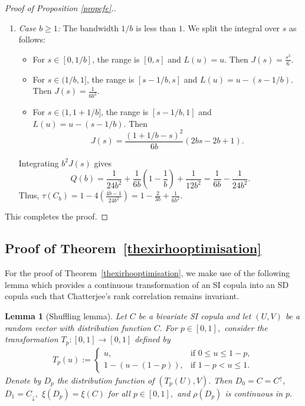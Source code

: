 \documentclass{article}
\theoremstyle{plain}
\newtheorem{lemma}{Lemma}
\theoremstyle{definition}
\begin{document}
\begin{proof}[Proof of Proposition \ref{propcfe}.]
\begin{enumerate}[label=(\roman*), font=\upshape]
    \item \emph{Case \(b \ge 1\):} The bandwidth \(1/b\) is less than \(1\). We split the integral over \(s\) as follows:
    \begin{itemize}
        \item For \(s \in [0, 1/b]\), the range is \([0,s]\) and \(L(u) = u\). Then \(J(s) = \frac{s^3}{6}\).
        \item For \(s \in (1/b, 1]\), the range is \([s-1/b, s]\) and \(L(u) = u - (s-1/b)\). Then \(J(s) = \frac{1}{6b^3}\).
        \item For \(s \in (1, 1+1/b]\), the range is \([s-1/b, 1]\) and \(L(u) = u - (s-1/b)\).
        Then
        \[
        J(s) = \frac{(1+1/b-s)^2}{6b}(2bs - 2b + 1)
        .\]
    \end{itemize}
    Integrating \(b^2 J(s)\) gives
    \[
        Q(b) = \frac{1}{24b^2} + \frac{1}{6b}\left(1-\frac{1}{b}\right) + \frac{1}{12b^2} = \frac{1}{6b} - \frac{1}{24b^2}.
    \]
    Thus, \(\tau(C_b) = 1 - 4\left(\frac{4b-1}{24b^2}\right) = 1 - \frac{2}{3b} + \frac{1}{6b^2}\).
\end{enumerate}
This completes the proof.
\end{proof}



\subsection{Proof of Theorem~\ref{thexirhooptimisation}}

For the proof of Theorem~\ref{thexirhooptimisation}, we make use of the following lemma which provides a continuous transformation of an SI copula into an SD copula such that Chatterjee's rank correlation remains invariant.

\begin{lemma}[Shuffling lemma]\label{lemshuff}
    Let \(C\) be a bivariate SI copula and let \((U,V)\) be a random vector with distribution function \(C.\) For \(p\in [0,1],\) consider the transformation \(T_p\colon [0,1]\to [0,1]\) defined by
    \begin{align}
        T_p(u) := \begin{cases}
        u, &\text{if } 0\le u \le 1-p,\\
        1-(u-(1-p)), & \text{if } 1-p < u \le 1.
    \end{cases}
    \end{align}
    Denote by \(D_p\) the distribution function of \((T_p(U),V).\) Then \(D_0 = C = C^\uparrow\), \(D_1 = C_\downarrow,\) \(\xi(D_p) = \xi(C)\) for all \(p\in [0,1],\) and \(\rho(D_p)\) is continuous in \(p.\)
\end{lemma}
\end{document}
